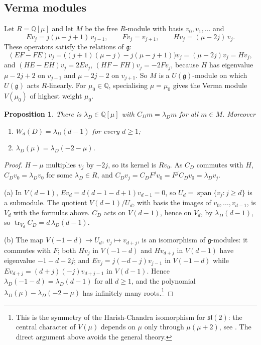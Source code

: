 \documentclass[11pt,a4paper,reqno]{amsart}
\newtheorem{proposition}[theorem]{Proposition}
\theoremstyle{definition}
\newcommand{\Q}{\mathbb{Q}}
\newcommand{\g}{\mathfrak{g}}
\newcommand{\slt}{\mathfrak{sl}(2)}
\newcommand{\Ue}{U(\g)}
\newcommand{\tr}{\operatorname{tr}}
\begin{document}
\subsection{Verma modules}
Let $R=\Q[\mu]$ and let $M$ be the free $R$-module with basis $v_0,v_1,\dots$ and
\begin{equation}\label{eq:verma}
Ev_j=j(\mu-j+1)\,v_{j-1},\qquad Fv_j=v_{j+1},\qquad Hv_j=(\mu-2j)\,v_j .
\end{equation}
These operators satisfy the relations of $\g$:
\[
(EF-FE)v_j=\bigl((j+1)(\mu-j)-j(\mu-j+1)\bigr)v_j=(\mu-2j)v_j=Hv_j,
\]
and $(HE-EH)v_j=2Ev_j$, $(HF-FH)v_j=-2Fv_j$, because $H$ has eigenvalue $\mu-2j+2$ on $v_{j-1}$ and $\mu-2j-2$ on $v_{j+1}$. So $M$ is a $\Ue$-module on which $\Ue$ acts $R$-linearly. For $\mu_0\in\Q$, specialising $\mu=\mu_0$ gives the Verma module $V(\mu_0)$ of highest weight $\mu_0$.

\begin{proposition}\label{prop:lambda}
There is $\lambda_D\in\Q[\mu]$ with $C_Dm=\lambda_Dm$ for all $m\in M$. Moreover
\begin{enumerate}
\item[(a)] $W_d(D)=\lambda_D(d-1)$ for every $d\ge1$;
\item[(b)] $\lambda_D(\mu)=\lambda_D(-2-\mu)$.
\end{enumerate}
\end{proposition}

\begin{proof}
$H-\mu$ multiplies $v_j$ by $-2j$, so its kernel is $Rv_0$. As $C_D$ commutes with $H$, $C_Dv_0=\lambda_Dv_0$ for some $\lambda_D\in R$, and $C_Dv_j=C_DF^jv_0=F^jC_Dv_0=\lambda_Dv_j$.

(a) In $V(d-1)$, $Ev_d=d(d-1-d+1)v_{d-1}=0$, so $U_d=\operatorname{span}\{v_j:j\ge d\}$ is a submodule. The quotient $V(d-1)/U_d$, with basis the images of $v_0,\dots,v_{d-1}$, is $V_d$ with the formulas above. $C_D$ acts on $V(d-1)$, hence on $V_d$, by $\lambda_D(d-1)$, so $\tr_{V_d}C_D=d\,\lambda_D(d-1)$.

(b) The map $V(-1-d)\to U_d$, $v_j\mapsto v_{d+j}$, is an isomorphism of $\g$-modules: it commutes with $F$; both $Hv_j$ in $V(-1-d)$ and $Hv_{d+j}$ in $V(d-1)$ have eigenvalue $-1-d-2j$; and $Ev_j=j(-d-j)v_{j-1}$ in $V(-1-d)$ while $Ev_{d+j}=(d+j)(-j)v_{d+j-1}$ in $V(d-1)$. Hence $\lambda_D(-1-d)=\lambda_D(d-1)$ for all $d\ge1$, and the polynomial $\lambda_D(\mu)-\lambda_D(-2-\mu)$ has infinitely many roots.\footnote{This is the symmetry of the Harish-Chandra isomorphism for $\slt$: the central character of $V(\mu)$ depends on $\mu$ only through $\mu(\mu+2)$, see \cite[Section 1.10]{Hum08}. The direct argument above avoids the general theory.}
\end{proof}
\end{document}
